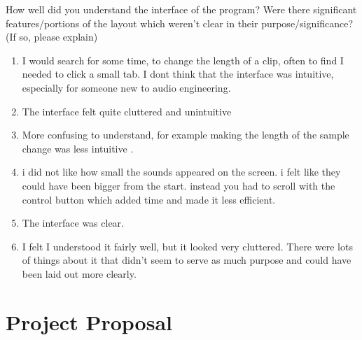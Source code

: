 \documentclass[12pt,a4paper,oneside,openright]{report}
\begin{document}
How well did you understand the interface of the program? Were there significant features/portions of the layout which weren't clear in their purpose/significance? (If so, please explain)
\begin{enumerate}
    \item I would search for some time, to change the length of a clip, often to find I needed to click a small tab. I dont think that the interface was intuitive, especially for someone new to audio engineering.
\item The interface felt quite cluttered and unintuitive
\item More confusing to understand, for example making the length of the sample change was less intuitive .
\item i did not like how small the sounds appeared on the screen. i felt like they could have been bigger from the start. instead you had to scroll with the control button which added time and made it less efficient.
\item The interface was clear.
\item I felt I understood it fairly well, but it looked very cluttered. There were lots of things about it that didn’t seem to serve as much purpose and could have been laid out more clearly.
\end{enumerate}


\chapter{Project Proposal}\label{appendix:proposal}


\end{document}
